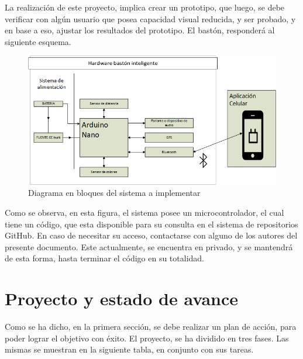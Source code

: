 La realización de este proyecto, implica crear un prototipo,
que luego, se debe verificar con algún usuario que posea capacidad visual reducida, y ser probado, y en base a eso, ajustar los resultados del prototipo. El bastón, responderá al siguiente esquema. 
\begin{figure}[ht!]
	\hspace{-2.5cm}
	\includegraphics{images/diagrama_baston_inteligente.png} 
	\caption{Diagrama en bloques del sistema a implementar}
\end{figure}

Como se observa, en esta figura, el sistema posee un microcontrolador, el cual tiene un código, que esta disponible para su consulta en el sistema de repositorios GitHub. En caso de necesitar su acceso, contactarse con alguno de los autores del presente documento. Este actualmente, se encuentra en privado, y se mantendrá de esta forma, hasta terminar el código en su totalidad. 

\section{Proyecto y estado de avance}


Como se ha dicho, en la primera sección, se debe realizar un plan de acción, para poder lograr el objetivo con éxito. El proyecto, se ha dividido en tres fases. Las mismas se muestran en la siguiente tabla, en conjunto con sus tareas.  

